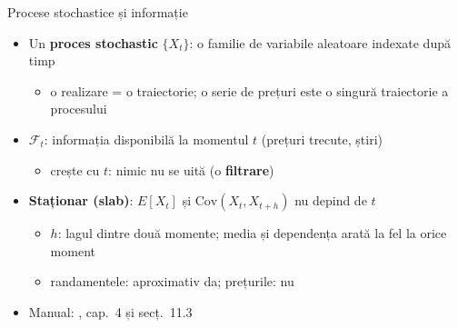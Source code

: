 \begin{frame}{Procese stochastice și informație}
\itemsize{\small}
\begin{itemize}
    \item Un \textbf{proces stochastic} $\{X_t\}$: o familie de variabile aleatoare indexate după timp
    \begin{itemize}
        \item o realizare = o traiectorie; o serie de prețuri este o singură traiectorie a procesului
    \end{itemize}
    \item $\mathcal{F}_t$: informația disponibilă la momentul $t$ (prețuri trecute, știri)
    \begin{itemize}
        \item crește cu $t$: nimic nu se uită (o \textbf{filtrare})
    \end{itemize}
    \item \textbf{Staționar (slab)}: $E[X_t]$ și $\text{Cov}(X_t, X_{t+h})$ nu depind de $t$
    \begin{itemize}
        \item $h$: lagul dintre două momente; media și dependența arată la fel la orice moment
        \item randamentele: aproximativ da; prețurile: nu
    \end{itemize}
    \item Manual: , cap.~4 și secț.~11.3
\end{itemize}
\end{frame}

